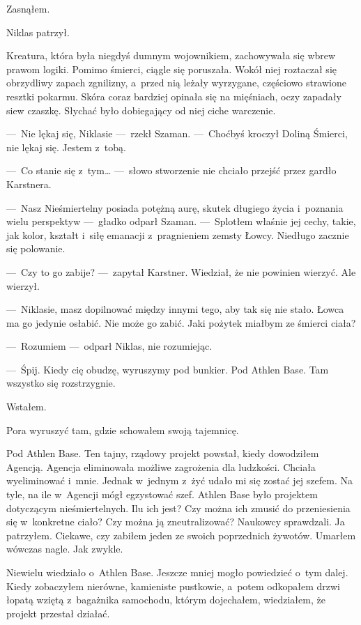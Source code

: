 Zasnąłem.

\paraSep

Niklas patrzył.

Kreatura, która była niegdyś dumnym wojownikiem, zachowywała się wbrew prawom logiki. Pomimo śmierci, ciągle się poruszała. Wokół niej roztaczał się obrzydliwy zapach zgnilizny, a~przed nią leżały wyrzygane, częściowo strawione resztki pokarmu. Skóra coraz bardziej opinała się na mięśniach, oczy zapadały siew czaszkę. Słychać było dobiegający od niej ciche warczenie. 

---~Nie lękaj się, Niklasie ---~rzekł Szaman. ---~Choćbyś kroczył Doliną Śmierci, nie lękaj się. Jestem z~tobą.

---~Co stanie się z~tym… ---~słowo stworzenie nie chciało przejść przez gardło Karstnera.

---~Nasz Nieśmiertelny posiada potężną aurę, skutek długiego życia i~poznania wielu perspektyw ---~gładko odparł Szaman. ---~Splotłem właśnie jej cechy, takie, jak kolor, kształt i~siłę emanacji z~pragnieniem zemsty Łowcy. Niedługo zacznie się polowanie.

---~Czy to go zabije? ---~zapytał Karstner. Wiedział, że nie powinien wierzyć. Ale wierzył.

---~Niklasie, masz dopilnować między innymi tego, aby tak się nie stało. Łowca ma go jedynie osłabić. Nie może go zabić. Jaki pożytek miałbym ze śmierci ciała?

---~Rozumiem ---~odparł Niklas, nie rozumiejąc.

---~Śpij. Kiedy cię obudzę, wyruszymy pod bunkier. Pod Athlen Base. Tam wszystko się rozstrzygnie.

\paraSep

Wstałem.

Pora wyruszyć tam, gdzie schowałem swoją tajemnicę.

Pod Athlen Base. Ten tajny, rządowy projekt powstał, kiedy dowodziłem Agencją. Agencja eliminowała możliwe zagrożenia dla ludzkości. Chciała wyeliminować i~mnie. Jednak w~jednym z~żyć udało mi się zostać jej szefem. Na tyle, na ile w~Agencji mógł egzystować szef. Athlen Base było projektem dotyczącym nieśmiertelnych. Ilu ich jest? Czy można ich zmusić do przeniesienia się w~konkretne ciało? Czy można ją zneutralizować? Naukowcy sprawdzali. Ja patrzyłem.
Ciekawe, czy zabiłem jeden ze swoich poprzednich żywotów. Umarłem wówczas nagle. Jak zwykle.

Niewielu wiedziało o~Athlen Base. Jeszcze mniej mogło powiedzieć o~tym dalej. Kiedy zobaczyłem nierówne, kamieniste pustkowie, a~potem odkopałem drzwi łopatą wziętą z~bagażnika samochodu, którym dojechałem, wiedziałem, że projekt przestał działać.

